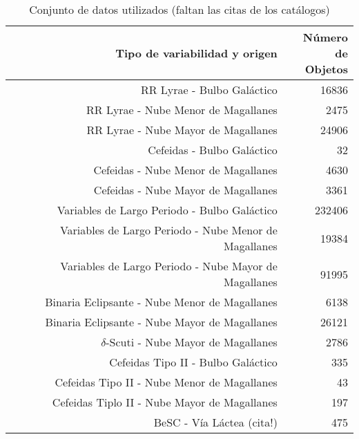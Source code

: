 \documentclass[letterpaper,12pt]{book}
\begin{document}
\begin{table}
  \centering
  \begin{tabular}{rr}
    \hline
    \hline
    Tipo de variabilidad y origen & \shortstack{Número \\de Objetos}\\
    \hline
    \hline
    RR Lyrae - Bulbo Galáctico\cite{soszynski_optical_2011-2} & 16836\\
    RR Lyrae - Nube Menor de Magallanes \cite{soszynski_optical_2010}& 2475\\
    RR Lyrae - Nube Mayor de Magallanes \cite{soszynski_optical_2009-1}& 24906\\
    \hline
    Cefeidas - Bulbo Galáctico \cite{soszynski_optical_2011}& 32\\%
    Cefeidas - Nube Menor de Magallanes \cite{soszynski_optical_2010-2}& 4630\\
    Cefeidas - Nube Mayor de Magallanes \cite{soszynski_optical_2008-1}& 3361\\
    \hline
    Variables de Largo Periodo - Bulbo Galáctico \cite{soszynski_optical_2013-1}& 232406\\
    Variables de Largo Periodo - Nube Menor de Magallanes \cite{soszynski_optical_2011-1}& 19384\\
    Variables de Largo Periodo - Nube Mayor de Magallanes \cite{soszynski_optical_2009}& 91995\\
    \hline
    Binaria Eclipsante - Nube Menor de Magallanes \cite{pawlak_eclipsing_2013}& 6138\\
    Binaria Eclipsante - Nube Mayor de Magallanes \cite{graczyk_optical_2011}& 26121\\
    \hline
    $\delta$-Scuti - Nube Mayor de Magallanes\cite{poleski_optical_2010} & 2786\\
    \hline
    Cefeidas Tipo II - Bulbo Galáctico \cite{soszynski_optical_2013}& 335\\
    Cefeidas Tipo II - Nube Menor de Magallanes \cite{soszynski_optical_2010-1}& 43\\
    Cefeidas Tiplo II - Nube Mayor de Magallanes \cite{soszynski_optical_2008}& 197\\
    \hline
    BeSC -  Vía Láctea (cita!) & 475\\
    \hline
    \hline 
  \end{tabular}
  \caption{Conjunto de datos utilizados (faltan las citas de los catálogos)}
  \label{cuadro:datosUsados}
\end{table}
\end{document}
